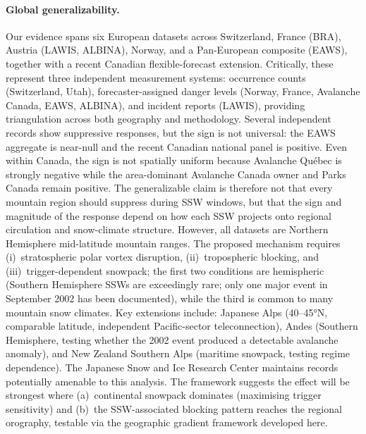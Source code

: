 \documentclass[11pt,letterpaper]{article}
\begin{document}
\paragraph{Global generalizability.} Our evidence spans six European datasets across Switzerland, France (BRA), Austria (LAWIS, ALBINA), Norway, and a Pan-European composite (EAWS), together with a recent Canadian flexible-forecast extension. Critically, these represent three independent measurement systems: occurrence counts (Switzerland, Utah), forecaster-assigned danger levels (Norway, France, Avalanche Canada, EAWS, ALBINA), and incident reports (LAWIS), providing triangulation across both geography and methodology. Several independent records show suppressive responses, but the sign is not universal: the EAWS aggregate is near-null and the recent Canadian national panel is positive. Even within Canada, the sign is not spatially uniform because Avalanche Qu\'ebec is strongly negative while the area-dominant Avalanche Canada owner and Parks Canada remain positive. The generalizable claim is therefore not that every mountain region should suppress during SSW windows, but that the sign and magnitude of the response depend on how each SSW projects onto regional circulation and snow-climate structure. However, all datasets are Northern Hemisphere mid-latitude mountain ranges. The proposed mechanism requires (i)~stratospheric polar vortex disruption, (ii)~tropospheric blocking, and (iii)~trigger-dependent snowpack; the first two conditions are hemispheric (Southern Hemisphere SSWs are exceedingly rare; only one major event in September 2002 has been documented\cite{Baldwin2021}), while the third is common to many mountain snow climates. Key extensions include: Japanese Alps (40--45°N, comparable latitude, independent Pacific-sector teleconnection), Andes (Southern Hemisphere, testing whether the 2002 event produced a detectable avalanche anomaly), and New Zealand Southern Alps (maritime snowpack, testing regime dependence). The Japanese Snow and Ice Research Center maintains records potentially amenable to this analysis. The framework suggests the effect will be strongest where (a)~continental snowpack dominates (maximising trigger sensitivity) and (b)~the SSW-associated blocking pattern reaches the regional orography, testable via the geographic gradient framework developed here.
\end{document}
